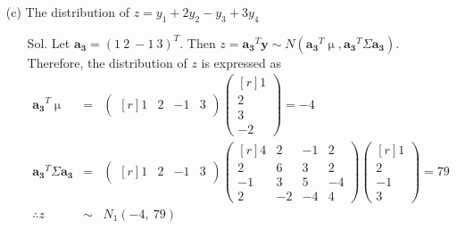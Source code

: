 \documentclass[12pt]{article} %
\begin{document}
\begin{enumerate}
\begin{enumerate}
		\item[(c)] The distribution of $z=y_{1}+2y_{2}-y_{3}+3y_{4}$
			\begin{enumerate}
				\item[Sol.] Let $\mathbf{a_{3}}=(1~2~-1~3)^{T}$. Then
				$z=\mathbf{a_{3}}^{T}\mathbf{y}\sim N(\mathbf{a_{3}}^{T}\upmu, 
				    \mathbf{a_{3}}^{T} \Sigma \mathbf{a_{3}})$. 
				Therefore, the distribution of $z$ is expressed as
				\begin{eqnarray*}
					\mathbf{a_{3}}^{T}\upmu&=&
					\begin{pmatrix}[r]
						1 & 2 & -1 & 3
					\end{pmatrix}
					\begin{pmatrix}[r]
						 1\\
						 2\\
						 3\\
						-2										
					\end{pmatrix}=-4\\
					\mathbf{a_{3}}^{T} \Sigma \mathbf{a_{3}}&=&
					\begin{pmatrix}[r]
						1 & 2 & -1 & 3					
					\end{pmatrix}
					\begin{pmatrix}[r]
						 4& 2& -1& 2\\
						 2& 6& 3& 2\\
					    -1& 3& 5& -4\\
					     2&-2&-4& 4  						
					\end{pmatrix}
					\begin{pmatrix}[r]
						 1 \\
						 2 \\
					    -1 \\
						 3 
					\end{pmatrix}=79\\
				\therefore z&\sim&N_{1}(-4,~79)											
				\end{eqnarray*} 
			\end{enumerate}
			

\end{enumerate}
\end{enumerate}
\end{document}
